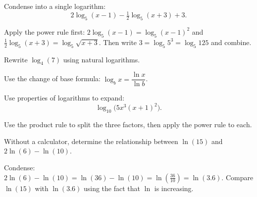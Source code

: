 \documentclass{ximera}
\begin{document}
\begin{problem}
Condense into a single logarithm:
$$2\log_{5}(x-1) - \tfrac{1}{2}\log_{5}(x+3) + 3.$$
\begin{hint}
Apply the power rule first: $2\log_5(x-1)=\log_5(x-1)^2$ and $\tfrac{1}{2}\log_5(x+3)=\log_5\sqrt{x+3}$. Then write $3 = \log_5 5^3 = \log_5 125$ and combine.
\end{hint}
\begin{multipleChoice}
\end{multipleChoice}
\end{problem}

\begin{problem}
Rewrite $\log_{4}(7)$ using natural logarithms.
\begin{hint}
Use the change of base formula: $\log_b x = \dfrac{\ln x}{\ln b}$.
\end{hint}
\begin{multipleChoice}
\end{multipleChoice}
\end{problem}

\begin{problem}
Use properties of logarithms to expand:
$$\log_{10}\!\big( 5x^{3}(x+1)^{2} \big).$$
\begin{hint}
Use the product rule to split the three factors, then apply the power rule to each.
\end{hint}
\begin{multipleChoice}
\end{multipleChoice}
\end{problem}

\begin{problem}
Without a calculator, determine the relationship between $\ln(15)$ and $2\ln(6) - \ln(10)$.
\begin{hint}
Condense: $2\ln(6)-\ln(10) = \ln(36)-\ln(10) = \ln\!\left(\tfrac{36}{10}\right) = \ln(3.6)$. Compare $\ln(15)$ with $\ln(3.6)$ using the fact that $\ln$ is increasing.
\end{hint}
\begin{multipleChoice}
\end{multipleChoice}
\end{problem}
\end{document}
